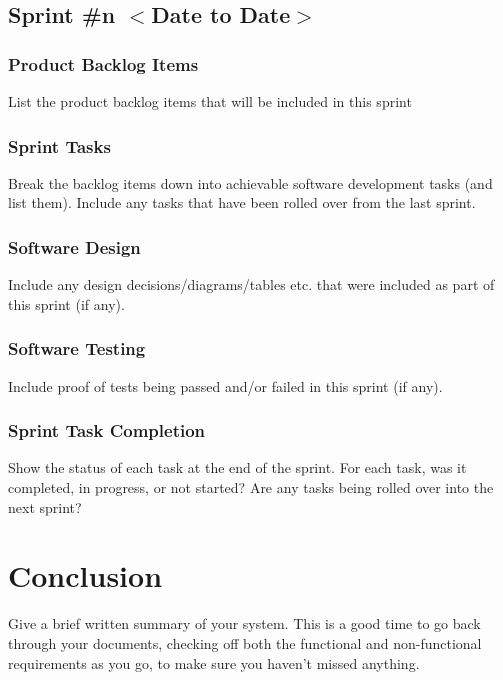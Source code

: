 \documentclass{scrreprt}
\begin{document}
% 
% 
\section{Sprint \#n $<$Date to Date$>$}

% 
\subsection{Product Backlog Items}
List the product backlog items that will be included in this sprint

% 
\subsection{Sprint Tasks}
Break the backlog items down into achievable software development tasks (and list them). Include any tasks that have been rolled over from the last sprint.

% 
\subsection{Software Design}
Include any design decisions/diagrams/tables etc. that were included as part of this sprint (if any).

% 
\subsection{Software Testing}
Include proof of tests being passed and/or failed in this sprint (if any).

% 
\subsection{Sprint Task Completion}
Show the status of each task at the end of the sprint. For each task, was it completed, in progress, or not started? Are any tasks being rolled over into the next sprint?


% 
% 
% 
\chapter{Conclusion}

Give a brief written summary of your system. This is a good time to go back through your documents, checking off both the functional and non-functional requirements as you go, to make sure you haven't missed anything. 
\end{document}
